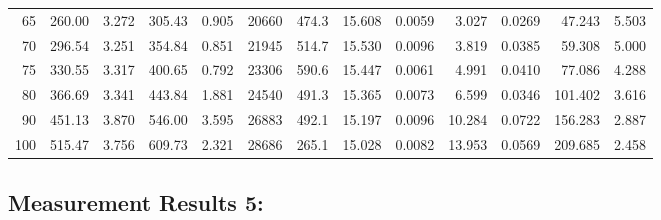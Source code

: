 \documentclass[10pt]{article}
\begin{document}
{\begin{tabular}{|r|rr|rr|rr|rr|rr|r|r|}
       65 &       260.00 &        3.272 &       305.43 &        0.905 &        20660 &        474.3 &       15.608 &       0.0059 &        3.027 &       0.0269 &       47.243 &        5.503 \\
       70 &       296.54 &        3.251 &       354.84 &        0.851 &        21945 &        514.7 &       15.530 &       0.0096 &        3.819 &       0.0385 &       59.308 &        5.000 \\
       75 &       330.55 &        3.317 &       400.65 &        0.792 &        23306 &        590.6 &       15.447 &       0.0061 &        4.991 &       0.0410 &       77.086 &        4.288 \\
       80 &       366.69 &        3.341 &       443.84 &        1.881 &        24540 &        491.3 &       15.365 &       0.0073 &        6.599 &       0.0346 &      101.402 &        3.616 \\
       90 &       451.13 &        3.870 &       546.00 &        3.595 &        26883 &        492.1 &       15.197 &       0.0096 &       10.284 &       0.0722 &      156.283 &        2.887 \\
      100 &       515.47 &        3.756 &       609.73 &        2.321 &        28686 &        265.1 &       15.028 &       0.0082 &       13.953 &       0.0569 &      209.685 &        2.458 \\
\hline
\end{tabular}
}



\subsection*{\large \bf Measurement Results 5:}
\end{document}
